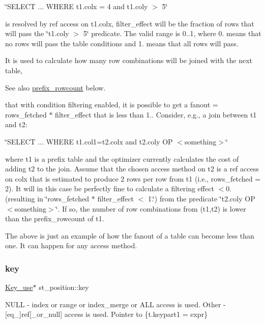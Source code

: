 \char`\"{}\+S\+E\+L\+E\+C\+T ... W\+H\+E\+R\+E t1.\+colx = 4 and t1.\+coly $>$ 5\char`\"{}

is resolved by ref access on t1.\+colx, filter\+\_\+effect will be the fraction of rows that will pass the \char`\"{}t1.\+coly $>$ 5\char`\"{} predicate. The valid range is 0..1, where 0. means that no rows will pass the table conditions and 1. means that all rows will pass.

It is used to calculate how many row combinations will be joined with the next table, \begin{DoxySeeAlso}{See also}
\mbox{\hyperlink{structst__position_aa29ae7911f9cc07153c57c5bc9ff9617}{prefix\+\_\+rowcount}} below.
\end{DoxySeeAlso}
that with condition filtering enabled, it is possible to get a fanout = rows\+\_\+fetched $\ast$ filter\+\_\+effect that is less than 1.. Consider, e.\+g., a join between t1 and t2\+:

\char`\"{}\+S\+E\+L\+E\+C\+T ... W\+H\+E\+R\+E t1.\+col1=t2.\+colx and t2.\+coly O\+P $<$something$>$\char`\"{}

where t1 is a prefix table and the optimizer currently calculates the cost of adding t2 to the join. Assume that the chosen access method on t2 is a \textquotesingle{}ref\textquotesingle{} access on \textquotesingle{}colx\textquotesingle{} that is estimated to produce 2 rows per row from t1 (i.\+e., rows\+\_\+fetched = 2). It will in this case be perfectly fine to calculate a filtering effect $<$0. (resulting in \char`\"{}rows\+\_\+fetched $\ast$ filter\+\_\+effect $<$ 1.\char`\"{}) from the predicate \char`\"{}t2.\+coly O\+P $<$something$>$\char`\"{}. If so, the number of row combinations from (t1,t2) is lower than the prefix\+\_\+rowcount of t1.

The above is just an example of how the fanout of a table can become less than one. It can happen for any access method. \mbox{\label{structst__position_a5d8ce81ce1aaae66efabc4bef2f53f4e}} 
\subsubsection{\texorpdfstring{key}{key}}
{\footnotesize\ttfamily \mbox{\hyperlink{classKey__use}{Key\+\_\+use}}$\ast$ st\+\_\+position\+::key}

N\+U\+LL -\/ \textquotesingle{}index\textquotesingle{} or \textquotesingle{}range\textquotesingle{} or \textquotesingle{}index\+\_\+merge\textquotesingle{} or \textquotesingle{}A\+LL\textquotesingle{} access is used. Other -\/ \mbox{[}eq\+\_\+\mbox{]}ref\mbox{[}\+\_\+or\+\_\+null\mbox{]} access is used. Pointer to \{t.\+keypart1 = expr\} \mbox{\label{structst__position_afa9fd7ef4d5fb77a167a68bd46f7b159}} 
